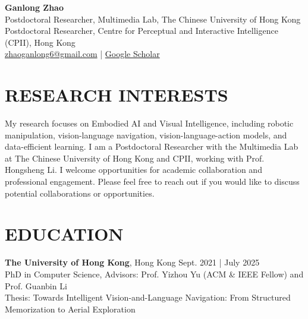 \documentclass[a4paper,9pt]{extarticle}
\begin{document}
\pagestyle{fancy}
\renewcommand{\headrulewidth}{0pt}
\fancyhead{}
\fancyhead[R]{}
\fancyfoot{}
\thispagestyle{empty} %

\begin{flushleft}
\textbf{\LARGE Ganlong Zhao}\\[2pt] %
Postdoctoral Researcher, Multimedia Lab, The Chinese University of Hong Kong\\
Postdoctoral Researcher, Centre for Perceptual and Interactive Intelligence (CPII), Hong Kong\\
\href{mailto:zhaoganlong6@gmail.com}{zhaoganlong6@gmail.com} | \href{https://scholar.google.com/citations?hl=zh-CN&user=4l2zOz4AAAAJ}{Google Scholar}

\end{flushleft}

\section*{RESEARCH INTERESTS}
\noindent
My research focuses on Embodied AI and Visual Intelligence, including robotic manipulation, vision-language navigation, vision-language-action models, and data-efficient learning.
I am a Postdoctoral Researcher with the Multimedia Lab at The Chinese University of Hong Kong and CPII, working with Prof. Hongsheng Li.
I welcome opportunities for academic collaboration and professional engagement. Please feel free to reach out if you would like to discuss potential collaborations or opportunities.

\section*{EDUCATION}
\noindent
\textbf{The University of Hong Kong}, Hong Kong \hfill Sept. 2021 | July 2025 \\ %
PhD in Computer Science, Advisors: Prof. Yizhou Yu (ACM \& IEEE Fellow) and Prof. Guanbin Li \\
Thesis: Towards Intelligent Vision-and-Language Navigation: From Structured Memorization to Aerial Exploration
\end{document}
